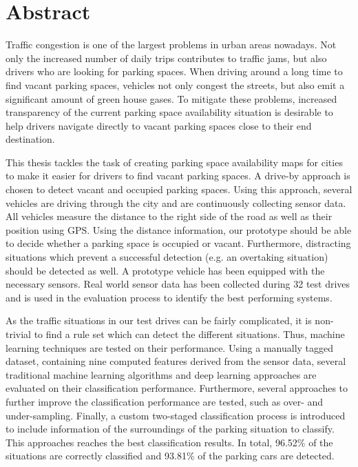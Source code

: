 

\chapter*{Abstract}

Traffic congestion is one of the largest problems in urban areas nowadays. Not only the increased number of daily trips contributes to traffic jams, but also drivers who are looking for parking spaces. When driving around a long time to find vacant parking spaces, vehicles not only congest the streets, but also emit a significant amount of green house gases. To mitigate these problems, increased transparency of the current parking space availability situation is desirable to help drivers navigate directly to vacant parking spaces close to their end destination. 

This thesis tackles the task of creating parking space availability maps for cities to make it easier for drivers to find vacant parking spaces. A drive-by approach is chosen to detect vacant and occupied parking spaces. 
Using this approach, several vehicles are driving through the city and are continuously collecting sensor data. All vehicles measure the distance to the right side of the road as well as their position using GPS. Using the distance information, our prototype should be able to decide whether a parking space is occupied or vacant. Furthermore, distracting situations which prevent a successful detection (e.g. an overtaking situation) should be detected as well. 
A prototype vehicle has been equipped with the necessary sensors. Real world sensor data has been collected during 32 test drives and is used in the evaluation process to identify the best performing systems.

As the traffic situations in our test drives can be fairly complicated, it is non-trivial to find a rule set which can detect the different situations. Thus, machine learning techniques are tested on their performance. Using a manually tagged dataset, containing nine computed features derived from the sensor data, several traditional machine learning algorithms and deep learning approaches are evaluated on their classification performance. Furthermore, several approaches to further improve the classification performance are tested, such as over- and under-sampling. 
Finally, a custom two-staged classification process is introduced to include information of the surroundings of the parking situation to classify. This approaches reaches the best classification results. In total, 96.52\% of the situations are correctly classified and 93.81\% of the parking cars are detected.


